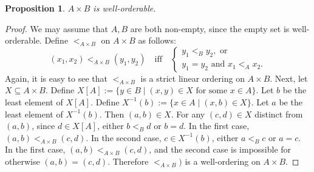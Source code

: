 \documentclass[12pt]{article}
\newtheorem{prop}{Proposition}
\begin{document}
\begin{prop} $A\times B$ is well-orderable. \end{prop}
\begin{proof}  We may assume that $A,B$ are both non-empty, since the empty set is well-orderable.  Define $<_{A\times B}$ on $A\times B$ as follows:
\begin{displaymath}
(x_1,x_2) <_{A\times B} (y_1,y_2) \quad \mbox{iff} \quad \left\{
\begin{array}{ll}
y_1 <_B y_2, \mbox{ or }\\
y_1=y_2 \mbox{ and } x_1 <_A x_2.
\end{array}
\right.
\end{displaymath}
Again, it is easy to see that $<_{A\times B}$ is a strict linear ordering on $A\times B$.  Next, let $X\subseteq A\times B$.  Define $X[A]:=\lbrace y\in B\mid (x,y)\in X \mbox{ for some }x\in A\rbrace$.  Let $b$ be the least element of $X[A]$.  Define $X^{-1}(b):=\lbrace x\in A\mid (x,b)\in X\rbrace$.  Let $a$ be the least element of $X^{-1}(b)$.  Then $(a,b)\in X$.  For any $(c,d)\in X$ distinct from $(a,b)$, since $d\in X[A]$, either $b<_B d$ or $b=d$.  In the first case, $(a,b)<_{A\times B} (c,d)$.  In the second case, $c\in X^{-1}(b)$, either $a <_B c$ or $a = c$.  In the first case, $(a,b) <_{A\times B} (c,d)$, and the second case is impossible for otherwise $(a,b)=(c,d)$.  Therefore $<_{A\times B})$ is a well-ordering on $A\times B$.
\end{proof}
\end{document}
